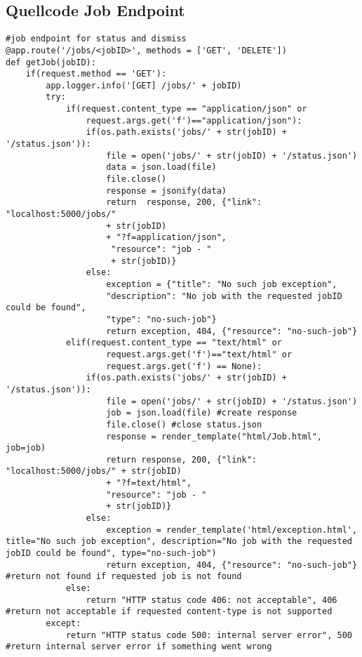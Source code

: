 \subsection{Quellcode Job Endpoint}
\begin{lstlisting}[caption={Job Endpoint}, style = Python]
#job endpoint for status and dismiss
@app.route('/jobs/<jobID>', methods = ['GET', 'DELETE']) 
def getJob(jobID):
    if(request.method == 'GET'):
        app.logger.info('[GET] /jobs/' + jobID)
        try:
            if(request.content_type == "application/json" or 
                request.args.get('f')=="application/json"): 
                if(os.path.exists('jobs/' + str(jobID) + '/status.json')):
                    file = open('jobs/' + str(jobID) + '/status.json')
                    data = json.load(file) 
                    file.close() 
                    response = jsonify(data) 
                    return  response, 200, {"link": "localhost:5000/jobs/" 
                    + str(jobID) 
                    + "?f=application/json",
                     "resource": "job - " 
                     + str(jobID)} 
                else:
                    exception = {"title": "No such job exception", 
                    "description": "No job with the requested jobID could be found", 
                    "type": "no-such-job"}
                    return exception, 404, {"resource": "no-such-job"} 
            elif(request.content_type == "text/html" or
                    request.args.get('f')=="text/html" or 
                    request.args.get('f') == None): 
                if(os.path.exists('jobs/' + str(jobID) + '/status.json')):
                    file = open('jobs/' + str(jobID) + '/status.json') 
                    job = json.load(file) #create response   
                    file.close() #close status.json
                    response = render_template("html/Job.html", job=job)
                    return response, 200, {"link": "localhost:5000/jobs/" + str(jobID) 
                    + "?f=text/html", 
                    "resource": "job - " 
                    + str(jobID)} 
                else:
                    exception = render_template('html/exception.html', title="No such job exception", description="No job with the requested jobID could be found", type="no-such-job")
                    return exception, 404, {"resource": "no-such-job"} #return not found if requested job is not found
            else:
                return "HTTP status code 406: not acceptable", 406 #return not acceptable if requested content-type is not supported
        except:
            return "HTTP status code 500: internal server error", 500 #return internal server error if something went wrong
        

\end{lstlisting}
